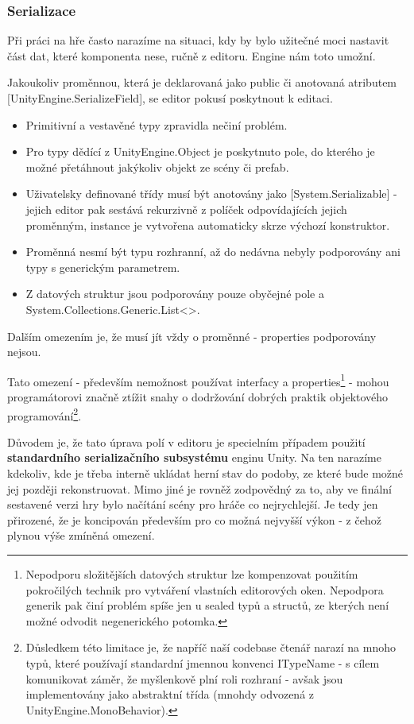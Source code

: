 \subsubsection*{Serializace} \label{gameObjectSerializationSubSubSection}

Při práci na hře často narazíme na situaci, kdy by bylo užitečné moci nastavit část dat, které komponenta nese, ručně z editoru. Engine nám toto umožní.

Jakoukoliv proměnnou, která je deklarovaná jako public či anotovaná atributem [UnityEngine.SerializeField], se editor pokusí poskytnout k editaci.
\begin{itemize}
    \item Primitivní a vestavěné typy zpravidla nečiní problém.
    \item Pro typy dědící z UnityEngine.Object je poskytnuto pole, do kterého je možné přetáhnout jakýkoliv objekt ze scény či prefab.
    \item Uživatelsky definované třídy musí být anotovány jako [System.Serializable] - jejich editor pak sestává rekurzivně z políček odpovídajících jejich proměnným, instance je vytvořena automaticky skrze výchozí konstruktor.
    \item Proměnná nesmí být typu rozhranní, až do nedávna nebyly podporovány ani typy s generickým parametrem.
    \item Z datových struktur jsou podporovány pouze obyčejné pole a System.Collections.Generic.List<>.
\end{itemize}
Dalším omezením je, že musí jít vždy o proměnné - properties podporovány nejsou.

Tato omezení - především nemožnost používat interfacy a properties\footnote{Nepodporu složitějších datových struktur lze kompenzovat použitím pokročilých technik pro vytváření vlastních editorových oken. Nepodpora generik pak činí problém spíše jen u sealed typů a structů, ze kterých není možné odvodit negenerického potomka.} - mohou programátorovi značně ztížit snahy o dodržování dobrých praktik objektového programování\footnote{Důsledkem této limitace je, že napříč naší codebase čtenář narazí na mnoho typů, které používají standardní jmennou konvenci ITypeName - s cílem komunikovat záměr, že myšlenkově plní roli rozhraní - avšak jsou implementovány jako abstraktní třída (mnohdy odvozená z UnityEngine.MonoBehavior).}.

Důvodem je, že tato úprava polí v editoru je specielním případem použití \textbf{standardního serializačního subsystému} enginu Unity. Na ten narazíme kdekoliv, kde je třeba interně ukládat herní stav do podoby, ze které bude možné jej později rekonstruovat. Mimo jiné je rovněž zodpovědný za to, aby ve finální sestavené verzi hry bylo načítání scény pro hráče co nejrychlejší. Je tedy jen přirozené, že je koncipován především pro co možná nejvyšší výkon - z čehož plynou výše zmíněná omezení.

